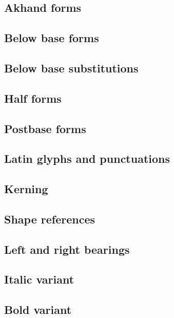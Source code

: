 \subsection {Akhand forms}
\subsection {Below base forms}
\subsection {Below base substitutions}
\subsection {Half forms}
\subsection {Postbase forms}
\subsection {Latin glyphs and punctuations}
\subsection {Kerning}
\subsection {Shape references}
\subsection {Left and right bearings}
\subsection {Italic variant}
\subsection {Bold variant}
